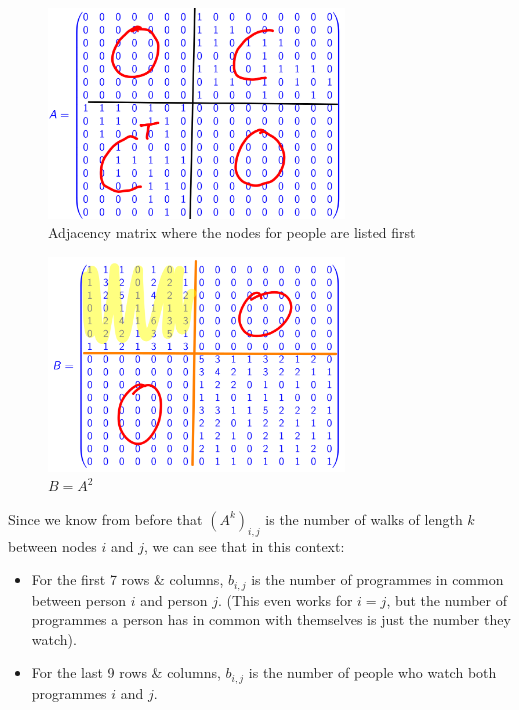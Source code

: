 \documentclass[a4paper,11pt]{article}
\begin{document}
\begin{figure}[H]
    \centering
    \includegraphics[width=0.7\textwidth]{./images/surveymatrix.png}
    \caption{ Adjacency matrix where the nodes for people are listed first }
\end{figure}

\begin{figure}[H]
    \centering
    \includegraphics[width=0.7\textwidth]{./images/surveymatrix2.png}
    \caption{ $B = A^2$ }
\end{figure}

Since we know from before that $(A^k)_{i,j}$ is the number of walks of length $k$between nodes $i$ and $j$, we can see that in this context:
\begin{itemize}
    \item   For the first 7 rows \& columns, $b_{i,j}$ is the number of programmes in common between person $i$ and person $j$.
            (This even works for $i=j$, but the number of programmes a person has in common with themselves is just the number they watch).
    \item   For the last 9 rows \& columns, $b_{i,j}$ is the number of people who watch both programmes $i$ and $j$.
\end{itemize}
\end{document}
